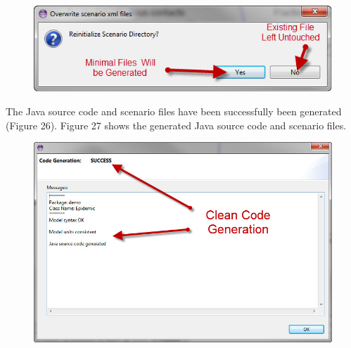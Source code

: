 \documentclass[11pt]{amsart}
\begin{document}
\begin{figure}[ht]
\begin{center}
\vspace{.2in}
\centerline {
\includegraphics[totalheight=0.1\textheight]{images/025.jpg}
}
\caption{}
\label{fig:025}
\end{center}
\end{figure}

The Java source code and scenario files have been successfully been generated (Figure 26). Figure 27 shows the generated Java source code and scenario files.

\begin{figure}[ht]
\begin{center}
\vspace{.2in}
\centerline {
\includegraphics[totalheight=0.3\textheight]{images/026.jpg}
}
\caption{}
\label{fig:026}
\end{center}
\end{figure}
\end{document}
